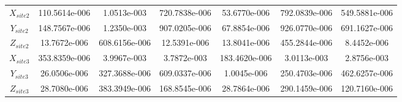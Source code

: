 \documentclass[]{aiaa-tc}%
\begin{document}
\begin{table}[H]
\begin{center}
\begin{tabular}{c|c|c|c|c|c|c}
$X_{site2}$ &    110.5614e-006 &    1.0513e-003 &  720.7838e-006 &   53.6770e-006 &  792.0839e-006 &  549.5881e-006 \\
$Y_{site2}$ &    148.7567e-006 &    1.2350e-003 &  907.0205e-006 &   67.8854e-006 &  926.0770e-006 &  691.1627e-006 \\
$Z_{site2}$ &     13.7672e-006 &  608.6156e-006 &   12.5391e-006 &   13.8041e-006 &  455.2844e-006 &    8.4452e-006 \\
$X_{site3}$ &    353.8359e-006 &    3.9967e-003 &    3.7872e-003 &  183.4620e-006 &    3.0113e-003 &    2.8756e-003 \\
$Y_{site3}$ &     26.0506e-006 &  327.3688e-006 &  609.0337e-006 &    1.0045e-006 &  250.4703e-006 &  462.6257e-006 \\
$Z_{site3}$ &     28.7080e-006 &  383.3949e-006 &  168.8545e-006 &   28.7864e-006 &  290.1459e-006 &  120.7160e-006 \\

			\end{tabular}
		\end{center}
	\end{table}  
	
\end{document}
